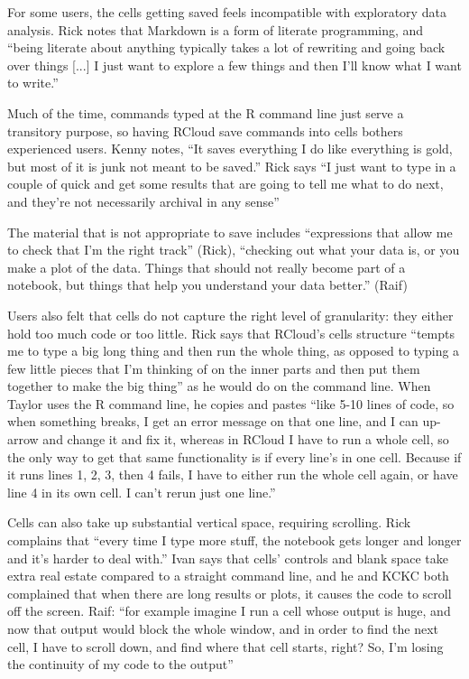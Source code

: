 For some users, the cells getting saved feels incompatible with exploratory data
analysis. Rick notes that Markdown is a form of literate programming, and
``being literate about anything typically takes a lot of rewriting and going
back over things [...] I just want to explore a few things and then I'll know
what I want to write.''

Much of the time, commands typed at the R command line just serve a transitory
purpose, so having RCloud save commands into cells bothers experienced
users. Kenny notes, ``It saves everything I do like everything is gold, but most
of it is junk not meant to be saved.'' Rick says ``I just want to type in a
couple of quick and get some results that are going to tell me what to do next,
and they're not necessarily archival in any sense''

The material that is not appropriate to save includes ``expressions that allow
me to check that I'm the right track'' (Rick), ``checking out what your data is,
or you make a plot of the data. Things that should not really become part of a
notebook, but things that help you understand your data better.'' (Raif)

Users also felt that cells do not capture the right level of granularity: they
either hold too much code or too little. Rick says that RCloud's cells structure
``tempts me to type a big long thing and then run the whole thing, as opposed to
typing a few little pieces that I'm thinking of on the inner parts and then put
them together to make the big thing'' as he would do on the command line. When
Taylor uses the R command line, he copies and pastes ``like 5-10 lines of code,
so when something breaks, I get an error message on that one line, and I can
up-arrow and change it and fix it, whereas in RCloud I have to run a whole cell,
so the only way to get that same functionality is if every line's in one
cell. Because if it runs lines 1, 2, 3, then 4 fails, I have to either run the
whole cell again, or have line 4 in its own cell. I can't rerun just one line.''

Cells can also take up substantial vertical space, requiring scrolling. Rick
complains that ``every time I type more stuff, the notebook gets longer and
longer and it's harder to deal with.'' Ivan says that cells' controls and blank
space take extra real estate compared to a straight command line, and he and
KCKC both complained that when there are long results or plots, it causes the
code to scroll off the screen. Raif: ``for example imagine I run a cell whose
output is huge, and now that output would block the whole window, and in order
to find the next cell, I have to scroll down, and find where that cell starts,
right? So, I'm losing the continuity of my code to the output''

